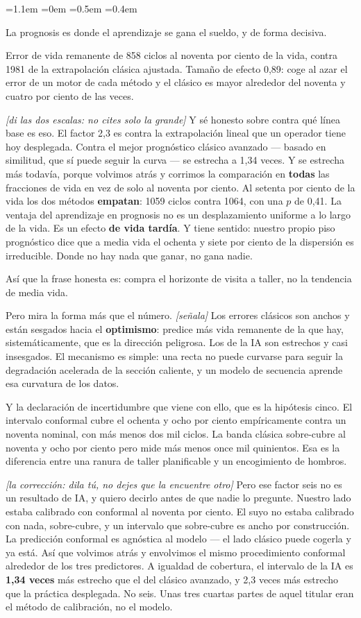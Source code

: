 \documentclass[11pt,a4paper]{article}
\newcommand{\diapo}[2]{%
  \vspace{0.9em}%
  \noindent{\color{bluec}\rule{\linewidth}{0.6pt}}\par\vspace{-0.35em}%
  \noindent{\bfseries\color{bluec} Diapositiva #1}\quad{\bfseries #2}\par
  \vspace{-0.15em}}
\newenvironment{decir}%
  {\begin{list}{}{\leftmargin=1.1em \rightmargin=0em \listparindent=0pt
       \itemindent=0pt \parsep=0.5em \topsep=0.4em}\item[]\ignorespaces}%
  {\end{list}}
\newcommand{\escena}[1]{{\itshape\color{grayc}[#1]}}
\begin{document}
\diapo{26}{H3 and H5 --- prognosis is where learning pays}
\begin{decir}
La prognosis es donde el aprendizaje se gana el sueldo, y de forma decisiva.

Error de vida remanente de 858 ciclos al noventa por ciento de la vida, contra
1981 de la extrapolación clásica ajustada. Tamaño de efecto 0,89: coge al azar el
error de un motor de cada método y el clásico es mayor alrededor del noventa y
cuatro por ciento de las veces.

\escena{di las dos escalas: no cites solo la grande} Y sé honesto sobre contra qué
línea base es eso. El factor 2,3 es contra la extrapolación lineal que un operador
tiene hoy desplegada. Contra el mejor prognóstico clásico avanzado --- basado en
similitud, que sí puede seguir la curva --- se estrecha a 1,34 veces. Y se estrecha
más todavía, porque volvimos atrás y corrimos la comparación en \textbf{todas} las
fracciones de vida en vez de solo al noventa por ciento. Al setenta por ciento de la
vida los dos métodos \textbf{empatan}: 1059 ciclos contra 1064, con una $p$ de 0,41.
La ventaja del aprendizaje en prognosis no es un desplazamiento uniforme a lo largo
de la vida. Es un efecto \textbf{de vida tardía}. Y tiene sentido: nuestro propio
piso prognóstico dice que a media vida el ochenta y siete por ciento de la dispersión
es irreducible. Donde no hay nada que ganar, no gana nadie.

Así que la frase honesta es: compra el horizonte de visita a taller, no la tendencia
de media vida.

Pero mira la forma más que el número. \escena{señala} Los errores clásicos son
anchos y están sesgados hacia el \textbf{optimismo}: predice más vida remanente de
la que hay, sistemáticamente, que es la dirección peligrosa. Los de la IA son
estrechos y casi insesgados. El mecanismo es simple: una recta no puede curvarse
para seguir la degradación acelerada de la sección caliente, y un modelo de
secuencia aprende esa curvatura de los datos.

Y la declaración de incertidumbre que viene con ello, que es la hipótesis cinco. El
intervalo conformal cubre el ochenta y ocho por ciento empíricamente contra un
noventa nominal, con más menos dos mil ciclos. La banda clásica sobre-cubre al
noventa y ocho por ciento pero mide más menos once mil quinientos. Esa es la
diferencia entre una ranura de taller planificable y un encogimiento de hombros.

\escena{la corrección: dila tú, no dejes que la encuentre otro} Pero ese factor seis
no es un resultado de IA, y quiero decirlo antes de que nadie lo pregunte. Nuestro
lado estaba calibrado con conformal al noventa por ciento. El suyo no estaba
calibrado con nada, sobre-cubre, y un intervalo que sobre-cubre es ancho por
construcción. La predicción conformal es agnóstica al modelo --- el lado clásico
puede cogerla y ya está. Así que volvimos atrás y envolvimos el mismo procedimiento
conformal alrededor de los tres predictores. A igualdad de cobertura, el intervalo de
la IA es \textbf{1,34 veces} más estrecho que el del clásico avanzado, y 2,3 veces
más estrecho que la práctica desplegada. No seis. Unas tres cuartas partes de aquel
titular eran el método de calibración, no el modelo.


\end{decir}
\end{document}
